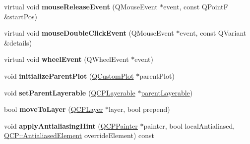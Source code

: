 \begin{DoxyCompactItemize}
\item 
virtual void {\bfseries mouse\+Release\+Event} (Q\+Mouse\+Event $\ast$event, const Q\+PointF \&start\+Pos)\hypertarget{class_q_c_p_layerable_a2f1b906a2cf286bc492b4600c369b28c}{}\label{class_q_c_p_layerable_a2f1b906a2cf286bc492b4600c369b28c}

\item 
virtual void {\bfseries mouse\+Double\+Click\+Event} (Q\+Mouse\+Event $\ast$event, const Q\+Variant \&details)\hypertarget{class_q_c_p_layerable_afedfd6f29df0297deba2812f4497810c}{}\label{class_q_c_p_layerable_afedfd6f29df0297deba2812f4497810c}

\item 
virtual void {\bfseries wheel\+Event} (Q\+Wheel\+Event $\ast$event)\hypertarget{class_q_c_p_layerable_ae8ec992ac0d81d65c70048fa3e8bd454}{}\label{class_q_c_p_layerable_ae8ec992ac0d81d65c70048fa3e8bd454}

\item 
void {\bfseries initialize\+Parent\+Plot} (\hyperlink{class_q_custom_plot}{Q\+Custom\+Plot} $\ast$parent\+Plot)\hypertarget{class_q_c_p_layerable_a8cbe5a0c9a5674249982f5ca5f8e02bc}{}\label{class_q_c_p_layerable_a8cbe5a0c9a5674249982f5ca5f8e02bc}

\item 
void {\bfseries set\+Parent\+Layerable} (\hyperlink{class_q_c_p_layerable}{Q\+C\+P\+Layerable} $\ast$\hyperlink{class_q_c_p_layerable_a98d79f5b716d45eac4347befe546d0ec}{parent\+Layerable})\hypertarget{class_q_c_p_layerable_aa23c893671f1f6744ac235cf2204cf3a}{}\label{class_q_c_p_layerable_aa23c893671f1f6744ac235cf2204cf3a}

\item 
bool {\bfseries move\+To\+Layer} (\hyperlink{class_q_c_p_layer}{Q\+C\+P\+Layer} $\ast$layer, bool prepend)\hypertarget{class_q_c_p_layerable_af94484cfb7cbbddb7de522e9be71d9a4}{}\label{class_q_c_p_layerable_af94484cfb7cbbddb7de522e9be71d9a4}

\item 
void {\bfseries apply\+Antialiasing\+Hint} (\hyperlink{class_q_c_p_painter}{Q\+C\+P\+Painter} $\ast$painter, bool local\+Antialiased, \hyperlink{namespace_q_c_p_ae55dbe315d41fe80f29ba88100843a0c}{Q\+C\+P\+::\+Antialiased\+Element} override\+Element) const \hypertarget{class_q_c_p_layerable_a62bd552d1a45aa9accb24b310542279e}{}\label{class_q_c_p_layerable_a62bd552d1a45aa9accb24b310542279e}

\end{DoxyCompactItemize}
